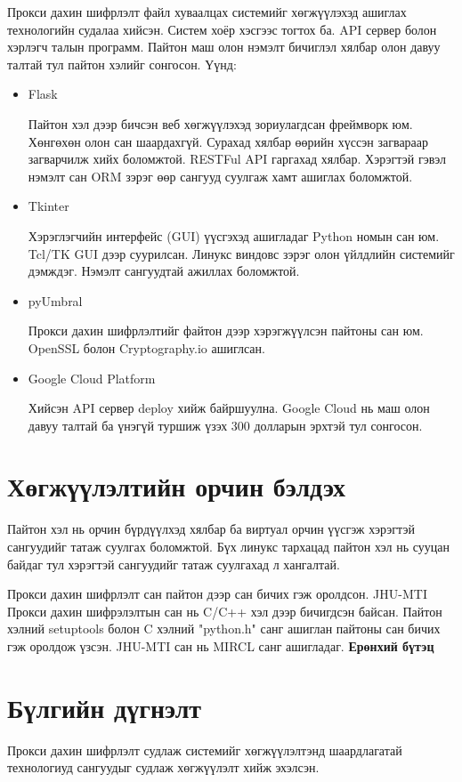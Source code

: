 Прокси дахин шифрлэлт файл хуваалцах системийг хөгжүүлэхэд ашиглах технологийн судалаа хийсэн.
Систем хоёр хэсгээс тогтох ба. API сервер болон хэрлэгч талын программ. Пайтон маш олон нэмэлт бичиглэл хялбар олон давуу талтай тул пайтон хэлийг сонгосон. Үүнд:
\begin{itemize}
    \item Flask
    
    Пайтон хэл дээр бичсэн веб хөгжүүлэхэд зориулагдсан фреймворк юм. Хөнгөхөн олон сан шаардахгүй. Сурахад хялбар өөрийн хүссэн загвараар загварчилж хийх боломжтой. RESTFul API гаргахад хялбар. Хэрэгтэй гэвэл нэмэлт сан ORM зэрэг өөр сангууд суулгаж хамт ашиглах боломжтой.
    \item Tkinter
    
    Хэрэглэгчийн интерфейс (GUI) үүсгэхэд ашигладаг Python номын сан юм. Tcl/TK GUI дээр суурилсан. Линукс виндовс зэрэг олон үйлдлийн системийг дэмждэг. Нэмэлт сангуудтай ажиллах боломжтой.
    \item pyUmbral
    
    Прокси дахин шифрлэлтийг файтон дээр хэрэгжүүлсэн пайтоны сан юм. OpenSSL болон Cryptography.io ашиглсан.
    \item Google Cloud Platform
    
    Хийсэн API сервер deploy хийж байршуулна. Google Cloud нь маш олон давуу талтай ба үнэгүй туршиж үзэх 300 долларын эрхтэй тул сонгосон.
\end{itemize}

\section{Хөгжүүлэлтийн орчин бэлдэх}

Пайтон хэл нь орчин бүрдүүлхэд хялбар ба виртуал орчин үүсгэж хэрэгтэй сангуудийг татаж суулгах боломжтой. Бүх линукс тархацад пайтон хэл нь сууцан байдаг тул хэрэгтэй сангуудийг татаж суулгахад л хангалтай.

Прокси дахин шифрлэлт сан пайтон дээр сан бичих гэж оролдсон. JHU-MTI Прокси дахин шифрэлэлтын сан нь C/C++ хэл дээр бичигдсэн байсан. Пайтон хэлний setuptools болон C хэлний "python.h" санг ашиглан пайтоны сан бичих гэж оролдож үзсэн. JHU-MTI сан нь MIRCL санг ашигладаг.
\textbf{Ерөнхий бүтэц}


\section{Бүлгийн дүгнэлт}
Прокси дахин шифрлэлт судлаж системийг хөгжүүлэлтэнд шаардлагатай технологиуд сангуудыг судлаж хөгжүүлэлт хийж эхэлсэн.